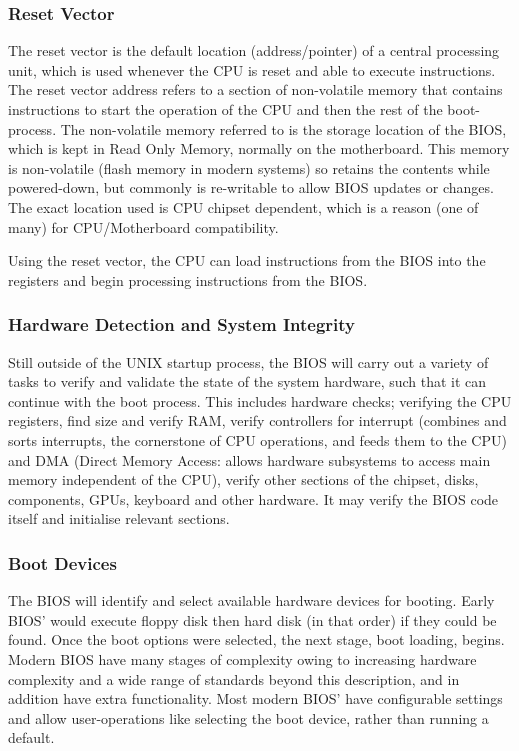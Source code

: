 \documentclass[]{article}
\begin{document}
        \subsubsection{Reset Vector}

            The reset vector is the default location (address/pointer) of a central processing unit, which is used whenever the CPU is reset and able to execute instructions. The reset vector address refers to a section of non-volatile memory that contains instructions to start the operation of the CPU and then the rest of the boot-process. The non-volatile memory referred to is the storage location of the BIOS, which is kept in Read Only Memory, normally on the motherboard. This memory is non-volatile (flash memory in modern systems) so retains the contents while powered-down, but commonly is re-writable to allow BIOS updates or changes. The exact location used is CPU chipset dependent, which is a reason (one of many) for CPU/Motherboard compatibility.

            Using the reset vector, the CPU can load instructions from the BIOS into the registers and begin processing instructions from the BIOS.

        \subsubsection{Hardware Detection and System Integrity}

            Still outside of the UNIX startup process, the BIOS will carry out a variety of tasks to verify and validate the state of the system hardware, such that it can continue with the boot process. This includes hardware checks; verifying the CPU registers, find size and verify RAM, verify controllers for interrupt (combines and sorts interrupts, the cornerstone of CPU operations, and feeds them to the CPU) and DMA (Direct Memory Access: allows hardware subsystems to access main memory independent of the CPU), verify other sections of the chipset, disks, components, GPUs, keyboard and other hardware. It may verify the BIOS code itself and initialise relevant sections.

        \subsubsection{Boot Devices}

            The BIOS will identify and select available hardware devices for booting. Early BIOS' would execute floppy disk then hard disk (in that order) if they could be found. Once the boot options were selected, the next stage, boot loading, begins. Modern BIOS have many stages of complexity owing to increasing hardware complexity and a wide range of standards beyond this description, and in addition have extra functionality. Most modern BIOS' have configurable settings and allow user-operations like selecting the boot device, rather than running a default.
\end{document}
